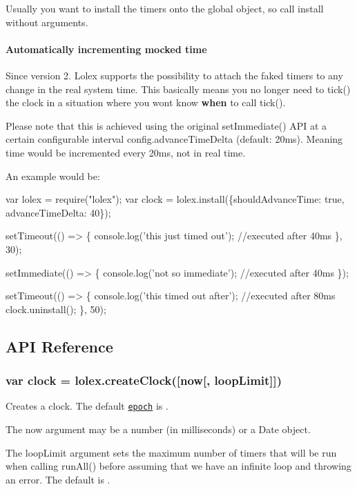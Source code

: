 Usually you want to install the timers onto the global object, so call {\ttfamily install} without arguments.

\paragraph*{Automatically incrementing mocked time}

Since version 2. Lolex supports the possibility to attach the faked timers to any change in the real system time. This basically means you no longer need to {\ttfamily tick()} the clock in a situation where you won\textquotesingle{}t know {\bfseries when} to call {\ttfamily tick()}.

Please note that this is achieved using the original set\+Immediate() A\+PI at a certain configurable interval {\ttfamily config.\+advance\+Time\+Delta} (default\+: 20ms). Meaning time would be incremented every 20ms, not in real time.

An example would be\+:


\begin{DoxyCode}
var lolex = require("lolex");
var clock = lolex.install(\{shouldAdvanceTime: true, advanceTimeDelta: 40\});

setTimeout(() => \{
    console.log('this just timed out'); //executed after 40ms
\}, 30);

setImmediate(() => \{
    console.log('not so immediate'); //executed after 40ms
\});

setTimeout(() => \{
    console.log('this timed out after'); //executed after 80ms
    clock.uninstall();
\}, 50);
\end{DoxyCode}


\subsection*{A\+PI Reference}

\subsubsection*{{\ttfamily var clock = lolex.\+create\+Clock(\mbox{[}now\mbox{[}, loop\+Limit\mbox{]}\mbox{]})}}

Creates a clock. The default \href{https://en.wikipedia.org/wiki/Epoch_%28reference_date%29}{\tt epoch} is {\ttfamily 0}.

The {\ttfamily now} argument may be a number (in milliseconds) or a Date object.

The {\ttfamily loop\+Limit} argument sets the maximum number of timers that will be run when calling {\ttfamily run\+All()} before assuming that we have an infinite loop and throwing an error. The default is {}.


